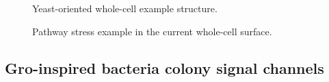 \begin{figure}[htbp]
\centering
\caption{Yeast-oriented whole-cell example structure.}
\label{fig:yeast-mvp-structure}
\end{figure}

\begin{figure}[htbp]
\centering
\caption{Pathway stress example in the current whole-cell surface.}
\label{fig:pathway-stress-example}
\end{figure}

\subsection{Gro-inspired bacteria colony signal channels}

